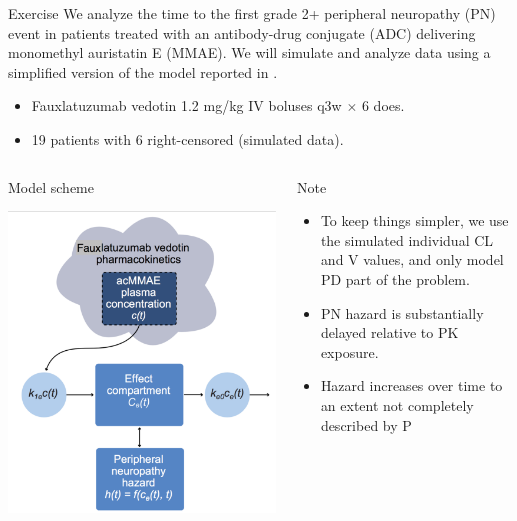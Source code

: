 \documentclass[presentation, allowframebreaks]{beamer}
\begin{document}
\begin{frame}[label={sec:org5d2d1f1}]{Exercise}
We analyze the time to the first grade 2+ peripheral neuropathy
(PN) event in patients treated with an antibody-drug conjugate (ADC) delivering monomethyl auristatin E
(MMAE). We will simulate and analyze data using a simplified version of the
model reported in \cite{lu_time--event_2017}.
\begin{itemize}
\item Fauxlatuzumab vedotin 1.2 mg/kg IV boluses q3w \(\times\) 6 does.
\item 19 patients with 6 right-censored (simulated data).
\end{itemize}
\begin{columns}
\begin{column}{0.3\columnwidth}
\begin{block}{Model scheme}
\begin{center}
\includegraphics[width=0.9\columnwidth]{./figures/lu2017Model.pdf}
\end{center}
\end{block}
\end{column}
\begin{column}{0.7\columnwidth}
\begin{block}{Note}
\begin{itemize}
\item To keep things simpler, we use the simulated individual CL and V values, and only model PD part of the problem.
\item PN hazard is substantially delayed relative to PK exposure.
\item Hazard increases over time to an extent not completely described by P
\end{itemize}
\end{block}
\end{column}
\end{columns}
\end{frame}
\end{document}

